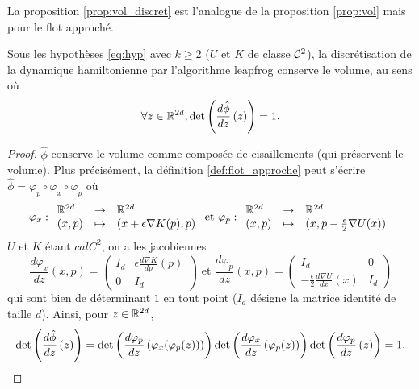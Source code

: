 \documentclass[10pt,a4paper]{article}
\begin{document}
La proposition \ref{prop:vol_discret} est l'analogue de la proposition \ref{prop:vol} mais pour le flot approché.

\begin{Prop}\label{prop:vol_discret}	
	Sous les hypothèses \eqref{eq:hyp} avec $k \geq 2$ ($U$ et $K$ de classe $\mathcal{C}^2$), la discrétisation de la dynamique hamiltonienne par l'algorithme leapfrog conserve le volume, au sens où
	$$
	\forall z \in \mathbb{R}^{2d}, \det \left( \frac{d \hat \phi}{d z} \left( z \right) \right) = 1.
	$$
\end{Prop}
\begin{proof}
	$\hat \phi$ conserve le volume comme composée de cisaillements (qui préservent le volume). Plus précisément, la définition \ref{def:flot_approche} peut s'écrire $\hat \phi= \varphi_p \circ \varphi_x \circ \varphi_p$ où
	$$
	\varphi_x : { \begin{array}{lcl} 
		\mathbb{R}^{2d} & \to & \mathbb{R}^{2d} \\
		(x,p) & \mapsto & (x + \epsilon \nabla K(p),p)
	 \end{array} }
	\text{ et }
	\varphi_p : { \begin{array}{lcl} 
		\mathbb{R}^{2d} & \to & \mathbb{R}^{2d} \\
		(x,p) & \mapsto & (x,p - \frac \epsilon 2 \nabla U(x))
	 \end{array} }
	$$
	$U$ et $K$ étant $calC^2$, on a les jacobiennes
	$$
	\frac{d\varphi_x}{dz}(x,p) =
	\begin{pmatrix}
	I_d & \epsilon \frac{d\nabla K}{dp}(p) \\
	0 & I_d
	\end{pmatrix}
	\text{ et }
	\frac{d\varphi_p}{dz}(x,p) =
	\begin{pmatrix}
	I_d & 0 \\
	- \frac \epsilon 2 \frac{d\nabla U}{dx}(x) & I_d
	\end{pmatrix}
	$$
	qui sont bien de déterminant $1$ en tout point ($I_d$ désigne la matrice identité de taille $d$). Ainsi, pour $z \in \mathbb{R}^{2d}$,
	$$
	\det \left( \frac{d \hat \phi}{d z} \left( z \right) \right) = \det \left( \frac{d \varphi_p}{d z} \left( \varphi_x(\varphi_p(z)) \right) \right) \det \left( \frac{d \varphi_x}{d z} \left( \varphi_p(z) \right) \right) \det \left( \frac{d \varphi_p}{d z} \left( z \right) \right) = 1.
	$$
\end{proof}
\end{document}
